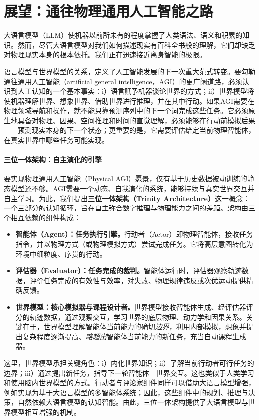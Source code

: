 \section{展望：通往物理通用人工智能之路}
\label{sec:path-to-physical-agi}
大语言模型（LLM）使机器以前所未有的程度掌握了人类语法、语义和积累的知识。然而，尽管大语言模型对我们如何描述现实有百科全书般的理解，它们却缺乏对物理现实本身的根本依托。我们正在迅速接近离身智能的极限\citep{coveney2025wall}。

语言模型与世界模型的关系，定义了人工智能发展的下一次重大范式转变。要勾勒通往通用人工智能（artificial general intelligence，AGI）的更广阔道路，必须认识到人工认知的一个基本事实：i）语言赋予机器谈论世界的方式；ii）世界模型将使机器理解世界、想象世界、借助世界进行推理，并在其中行动。如果AGI需要在物理领域导航和操作，就不能只靠预测序列中的下一个词完成这些任务。它必须原生地具备对物理、因果、空间推理和时间的直觉理解，必须能够在行动前模拟后果——预测现实本身的下一个状态；更重要的是，它需要评估给定当前物理智能体，在真实世界中哪些任务可能实现。

\paragraph{三位一体架构：自主演化的引擎}
要实现物理通用人工智能（Physical AGI）愿景，仅有基于历史数据被动训练的静态模型还不够。AGI需要一个动态、自我演化的系统，能够持续与真实世界交互并自主学习。为此，我们提出\textbf{三位一体架构（Trinity Architecture）}这一概念：一个三部分的认知循环，旨在自主弥合数字推理与物理能力之间的差距。架构由三个相互依赖的组件构成：
\begin{itemize}
\item \textbf{智能体（Agent）：任务执行引擎。}行动者（Actor）即物理智能体，接收任务指令，并以物理方式（或物理模拟方式）尝试完成任务。它将高层意图转化为环境中细粒度、序贯的行动。
\item \textbf{评估器（Evaluator）：任务完成的裁判。}智能体运行时，评估器观察轨迹数据，评价任务完成的有效性与效率，对失败、物理规律违反或次优运动提供精确反馈。
\item \textbf{世界模型：核心模拟器与课程设计者。}世界模型接收智能体生成、经评估器评分的轨迹数据，通过观察交互，学习世界的底层物理、动力学和因果关系。关键在于，世界模型理解智能体当前能力的确切\emph{边界}，利用内部模拟，想象并提出复杂程度逐渐提高、\textit{略超出}智能体当前能力的新任务，充当自动课程生成器。
\end{itemize}

这里，世界模型承担关键角色：i）内化世界知识；ii）了解当前行动者可行任务的边界；iii）通过提出新任务，指导下一轮智能体—世界交互。这也类似于人类学习和使用脑内世界模型的方式\citep{taniguchi2023world,deng2025simura}。行动者与评论家组件同样可以借助大语言模型增强，例如实现为基于大语言模型的多智能体系统\citep{yang2025unlocking}；因此，这些组件中的规划、推理与决策，自然依赖大语言模型的认知智能。由此，三位一体架构提供了大语言模型与世界模型相互增强的机制。

